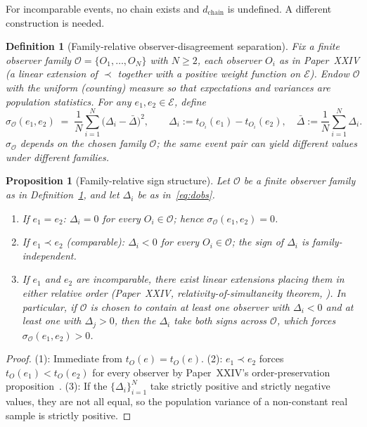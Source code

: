 \documentclass[12pt]{article}
\newtheorem{proposition}[theorem]{Proposition}
\newtheorem{definition}[theorem]{Definition}
\newcommand{\Ecal}{\mathcal{E}}
\newcommand{\Ocal}{\mathcal{O}}
\begin{document}
For incomparable events, no chain exists and $d_{\mathrm{chain}}$ is undefined. A different construction is needed.

\begin{definition}[Family-relative observer-disagreement separation]\label{def:dobs}
Fix a finite observer family $\Ocal = \{O_1, \ldots, O_N\}$ with $N \geq 2$, each observer $O_i$ as in Paper~XXIV (a linear extension of $\prec$ together with a positive weight function on $\Ecal$). Endow $\Ocal$ with the uniform (counting) measure so that expectations and variances are population statistics. For any $e_1, e_2 \in \Ecal$, define
\begin{equation}\label{eq:dobs}
    \sigma_{\Ocal}(e_1, e_2) \;=\; \frac{1}{N}\sum_{i=1}^{N} \bigl(\Delta_i - \bar{\Delta}\bigr)^2, \qquad \Delta_i := t_{O_i}(e_1) - t_{O_i}(e_2), \quad \bar{\Delta} := \frac{1}{N}\sum_{i=1}^{N}\Delta_i.
\end{equation}
$\sigma_{\Ocal}$ depends on the chosen family $\Ocal$; the same event pair can yield different values under different families.
\end{definition}

\begin{proposition}[Family-relative sign structure]\label{prop:dobs}
Let $\Ocal$ be a finite observer family as in Definition~\ref{def:dobs}, and let $\Delta_i$ be as in~\eqref{eq:dobs}.
\begin{enumerate}
    \item If $e_1 = e_2$: $\Delta_i = 0$ for every $O_i \in \Ocal$; hence $\sigma_{\Ocal}(e_1, e_2) = 0$.
    \item If $e_1 \prec e_2$ (comparable): $\Delta_i < 0$ for every $O_i \in \Ocal$; the sign of $\Delta_i$ is family-independent.
    \item If $e_1$ and $e_2$ are incomparable, there exist linear extensions placing them in either relative order (Paper~XXIV, relativity-of-simultaneity theorem, \citealt{SmartXXIV}). In particular, if $\Ocal$ is chosen to contain at least one observer with $\Delta_i < 0$ and at least one with $\Delta_j > 0$, then the $\Delta_i$ take both signs across $\Ocal$, which forces $\sigma_{\Ocal}(e_1, e_2) > 0$.
\end{enumerate}
\end{proposition}

\begin{proof}
(1): Immediate from $t_O(e) = t_O(e)$. (2): $e_1 \prec e_2$ forces $t_O(e_1) < t_O(e_2)$ for every observer by Paper~XXIV's order-preservation proposition~\citep{SmartXXIV}. (3): If the $\{\Delta_i\}_{i=1}^N$ take strictly positive and strictly negative values, they are not all equal, so the population variance of a non-constant real sample is strictly positive.
\end{proof}
\end{document}
